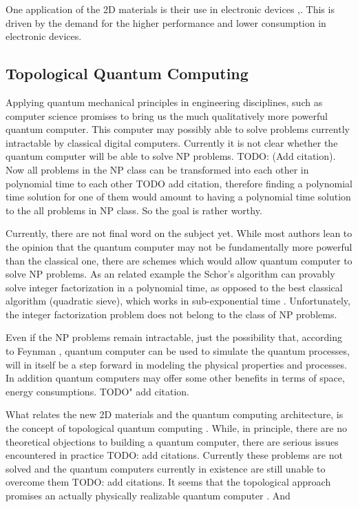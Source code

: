 One application of the 2D materials is their use in electronic devices \cite{2DEJour1},\cite{2DEJour2}. This is driven by the demand for the higher performance and lower consumption in electronic devices.

\subsection*{Topological Quantum Computing}

Applying quantum mechanical principles in engineering disciplines, such as computer science \cite{FQC} promises to bring us the much qualitatively more powerful quantum computer. This computer may possibly able to solve problems currently intractable by classical digital computers. Currently it is not clear whether the quantum computer will be able to solve NP problems. TODO: (Add citation). Now all problems in the NP class can be transformed into each other in polynomial time to each other TODO add citation,  therefore finding a polynomial time solution for one of them would amount to having a polynomial time solution to the all problems in NP class. So the goal is rather worthy.

Currently, there are not final word on the subject yet. While most authors lean to the opinion that the quantum computer may not be fundamentally more powerful than the classical one, there are schemes \cite{NLQC} which would allow quantum computer to solve NP problems. As an related example the Schor's algorithm \cite{Schor} can provably solve integer factorization in a polynomial time, as opposed to the best classical algorithm (quadratic sieve), which works in sub-exponential time \cite{Pomerance}. Unfortunately, the integer factorization problem does not belong to the class of NP problems. 

Even if the NP problems remain intractable, just the possibility that, according to Feynman \cite{FQC}, quantum computer can be used to simulate the quantum processes, will in itself be a step forward in modeling the physical properties and processes. In addition quantum computers may offer some other benefits in terms of space, energy consumptions. TODO" add citation.

What relates the new 2D materials and the quantum computing architecture, is the concept of topological quantum computing \cite{Tqc1}.  While, in principle, there are no theoretical objections to building a quantum computer, there are serious issues encountered in practice TODO: add citations. Currently these problems are not solved and the quantum computers currently in existence are still unable to overcome them TODO: add citations.
It seems that the topological approach promises an actually physically realizable quantum computer \cite{Tqc2,Tqc3}. And 


